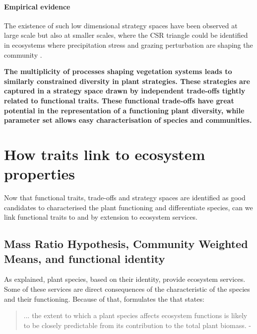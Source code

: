 \paragraph{Empirical evidence}

The existence of such low dimensional strategy spaces have been observed at large scale \parencite{ pierce_allocating_2013, diaz_global_2016} but also at smaller scales, where the CSR triangle could be identified in ecosystems where precipitation stress and grazing perturbation are shaping the community \cite{frenette-dussault_functional_2012}.

\textbf{The multiplicity of processes shaping vegetation systems leads to similarly constrained diversity in plant strategies. These strategies are captured in a strategy space drawn by independent trade-offs tightly related to functional traits. These functional trade-offs have great potential in the representation of a functioning plant diversity, while parameter set allows easy characterisation of species and communities.}



\section{How traits link to ecosystem properties}

Now that functional traits, trade-offs and strategy spaces are identified as good candidates to characterised the plant functioning and differentiate species, can we link functional traits to  and by extension to ecosystem services.

\subsection{Mass Ratio Hypothesis, Community Weighted Means, and functional identity}

As explained, plant species, based on their identity, provide ecosystem services. Some of these services are direct consequences of the characteristic of the species and their functioning. Because of that, \cite{grime_benefits_1998} formulates the  that states: 

\begin{quotation}
... the extent to which a plant species affects ecosystem functions is likely to be closely predictable from its contribution to the total plant biomass. - \cite{grime_benefits_1998}
\end{quotation}

